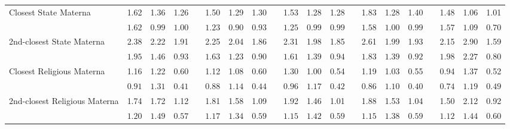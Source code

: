 \begin{center}
{\begin{longtable}{L{5cm} c c c p{.5cm} c c c p{.5cm} c c c p{.5cm} c c c p{.5cm} c c c}
Closest State Materna & 1.62 &      1.36 &      1.26 & &      1.50 &      1.29 &      1.30 & &      1.53 &      1.28 &      1.28 & &      1.83 &      1.28 &      1.40 & &      1.48 &      1.06 &      1.01 \\*
& $\mathit{     1.62}$ & $\mathit{     0.99}$ & $\mathit{     1.00}$ & & $\mathit{     1.23}$ & $\mathit{     0.90}$ & $\mathit{     0.93}$ & & $\mathit{     1.25}$ & $\mathit{     0.99}$ & $\mathit{     0.99}$ & & $\mathit{     1.58}$ & $\mathit{     1.00}$ & $\mathit{     0.99}$ & & $\mathit{     1.57}$ & $\mathit{     1.09}$ & $\mathit{     0.70}$ \\[.7em]
2nd-closest State Materna & 2.38 &      2.22 &      1.91 & &      2.25 &      2.04 &      1.86 & &      2.31 &      1.98 &      1.85 & &      2.61 &      1.99 &      1.93 & &      2.15 &      2.90 &      1.59 \\*
& $\mathit{     1.95}$ & $\mathit{     1.46}$ & $\mathit{     0.93}$ & & $\mathit{     1.63}$ & $\mathit{     1.23}$ & $\mathit{     0.90}$ & & $\mathit{     1.61}$ & $\mathit{     1.39}$ & $\mathit{     0.94}$ & & $\mathit{     1.83}$ & $\mathit{     1.39}$ & $\mathit{     0.92}$ & & $\mathit{     1.98}$ & $\mathit{     2.27}$ & $\mathit{     0.80}$ \\[.7em]
Closest Religious Materna & 1.16 &      1.22 &      0.60 & &      1.12 &      1.08 &      0.60 & &      1.30 &      1.00 &      0.54 & &      1.19 &      1.03 &      0.55 & &      0.94 &      1.37 &      0.52 \\*
& $\mathit{     0.91}$ & $\mathit{     1.31}$ & $\mathit{     0.41}$ & & $\mathit{     0.88}$ & $\mathit{     1.14}$ & $\mathit{     0.44}$ & & $\mathit{     0.96}$ & $\mathit{     1.17}$ & $\mathit{     0.42}$ & & $\mathit{     0.86}$ & $\mathit{     1.10}$ & $\mathit{     0.40}$ & & $\mathit{     0.74}$ & $\mathit{     1.19}$ & $\mathit{     0.49}$ \\[.7em]
2nd-closest Religious Materna & 1.74 &      1.72 &      1.12 & &      1.81 &      1.58 &      1.09 & &      1.92 &      1.46 &      1.01 & &      1.88 &      1.53 &      1.04 & &      1.50 &      2.12 &      0.92 \\*
& $\mathit{     1.20}$ & $\mathit{     1.49}$ & $\mathit{     0.57}$ & & $\mathit{     1.17}$ & $\mathit{     1.34}$ & $\mathit{     0.59}$ & & $\mathit{     1.15}$ & $\mathit{     1.42}$ & $\mathit{     0.59}$ & & $\mathit{     1.15}$ & $\mathit{     1.38}$ & $\mathit{     0.59}$ & & $\mathit{     1.12}$ & $\mathit{     1.44}$ & $\mathit{     0.60}$ \\[.7em]
\hline
\end{longtable}
}
\end{center}
